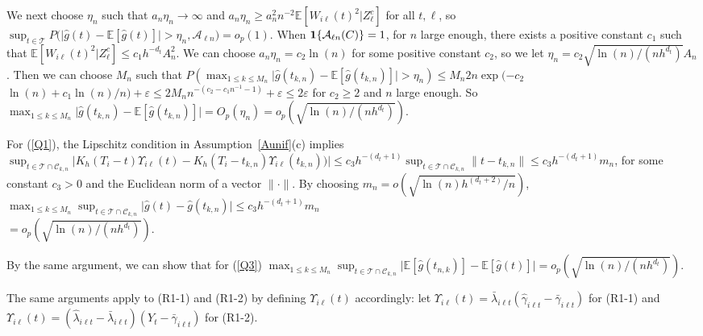 \documentclass[lettersize, 12pt]{article}
\begin{document}
{We next choose $\eta_n$ such that $a_n\eta_n \rightarrow \infty$ and $a_n\eta_n \geq a_n^2 n^{-2}  \mathbb{E}\left[W_{i\ell}(t)^2|Z_\ell^c\right]$ for all $t, \ell$, so $\sup_{t\in\mathcal{T}}P\big( \big| \hat g(t) - \mathbb{E}[\hat g(t)] \big| > \eta_n, \mathcal{A}_{\ell n} \big) = o_p(1)$.
When ${\bf 1}\{\mathcal{A}_{\ell n}(C)\} = 1$, for $n$ large enough, there exists a positive constant $c_1$ such that $\mathbb{E}\left[W_{i\ell}(t)^2|Z_\ell^c\right] \leq c_1h^{-d_t} A_n^2$.
We can choose $a_n\eta_n = c_2 \ln(n)$ for some positive constant $c_2$, so we let $\eta_n = c_2 \sqrt{\ln(n)/(nh^{d_t})}A_n$.
Then we can choose $M_n$ such that $P\left(\max_{1\leq k\leq M_n} \big| \hat g(t_{k,n}) - \mathbb{E}[\hat g(t_{k,n})] \big| > \eta_n \right) 
\leq M_n 2n\exp(-c_2$\\ $\ln(n) + c_1\ln(n)/n)+ \varepsilon  \leq 2M_n n^{-(c_2 -c_1n^{-1} -1)} + \varepsilon\leq 2\varepsilon$ for $c_2 \geq 2$ and $n$ large enough.
So $\max_{1\leq k\leq M_n} \big| \hat g(t_{k,n}) - \mathbb{E}[\hat g(t_{k,n})] \big| = O_p(\eta_n) = o_p( \sqrt{\ln(n)/(nh^{d_t})})$.


For (\ref{Q1}), the Lipschitz condition in Assumption~\ref{Aunif}(c) implies
$\sup_{t\in\mathcal{T}\cap \mathcal{C}_{k,n}} \big|
K_h(T_i - t)\Upsilon_{i\ell}(t) - K_h(T_i - t_{k,n})\Upsilon_{i\ell}(t_{k,n}))
\big|
\leq 
c_3 h^{-(d_t+1)} \sup_{t\in\mathcal{T}\cap \mathcal{C}_{k,n}} \| t - t_{k,n}\|
\leq
c_3 h^{-(d_t+1)} m_n$, for some constant $c_3 > 0$ and the Euclidean norm of a vector $\|\cdot\|$.
By choosing $m_n = o(\sqrt{\ln(n)h^{(d_t+2)}/n })$, $\max_{1\leq k\leq M_n }\sup_{t\in \mathcal{T}\cap \mathcal{C}_{k,n}} \big| \hat g(t) -\hat g(t_{k,n}) \big| 
\leq c_3 h^{-(d_t + 1)}m_n $\\$=o_p(\sqrt{\ln(n)/(nh^{d_t})})$.

By the same argument, we can show that for (\ref{Q3}) $\max_{1\leq k\leq M_n }\sup_{t\in \mathcal{T}\cap \mathcal{C}_{k,n}} \big| \mathbb{E}[\hat g(t_{n,k})] - \mathbb{E}[\hat g(t)] \big|  = o_p(\sqrt{\ln(n)/(nh^{d_t})})$.


The same arguments apply to (R1-1) and (R1-2) by defining $\Upsilon_{i\ell}(t)$ accordingly:
let $\Upsilon_{i\ell}(t) = \bar\lambda_{i\ell t}(\hat \gamma_{i\ell t} - \bar\gamma_{i\ell t})$ for (R1-1) and 
$\Upsilon_{i\ell}(t) = (\hat \lambda_{i\ell t} - \bar\lambda_{i\ell t})(Y_t - \bar\gamma_{i\ell t})$ for (R1-2).

}
\end{document}
